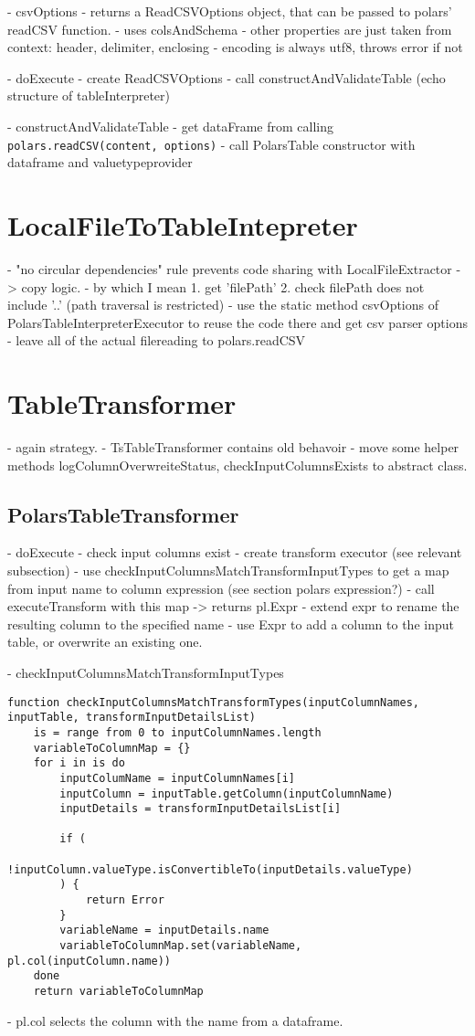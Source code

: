 - csvOptions
- returns a ReadCSVOptions object, that can be passed to polars' readCSV function.
- uses colsAndSchema
- other properties are just taken from context: header, delimiter, enclosing
- encoding is always utf8, throws error if not

- doExecute
- create ReadCSVOptions
- call constructAndValidateTable (echo structure of tableInterpreter)

- constructAndValidateTable
- get dataFrame from calling \Verb|polars.readCSV(content, options)|
- call PolarsTable constructor with dataframe and valuetypeprovider

\section{LocalFileToTableIntepreter}
- "no circular dependencies" rule prevents code sharing with LocalFileExtractor -> copy logic.
- by which I mean 1. get 'filePath' 2. check filePath does not include '..' (path traversal is restricted)
- use the static method csvOptions of PolarsTableInterpreterExecutor to reuse the code there and get csv parser options
- leave all of the actual filereading to polars.readCSV


\section{TableTransformer}
- again strategy.
- TsTableTransformer contains old behavoir
- move some helper methods logColumnOverwreiteStatus, checkInputColumnsExists to abstract class.

\subsection{PolarsTableTransformer}
- doExecute
- check input columns exist
- create transform executor (see relevant subsection)
- use checkInputColumnsMatchTransformInputTypes to get a map from input name to column expression (see section polars expression?)
- call executeTransform with this map -> returns pl.Expr
- extend expr to rename the resulting column to the specified name
- use Expr to add a column to the input table, or overwrite an existing one.


- checkInputColumnsMatchTransformInputTypes
\begin{listing}
	\begin{verbatim}
function checkInputColumnsMatchTransformTypes(inputColumnNames, inputTable, transformInputDetailsList)
	is = range from 0 to inputColumnNames.length
	variableToColumnMap = {}
	for i in is do
		inputColumName = inputColumnNames[i]
		inputColumn = inputTable.getColumn(inputColumnName)
		inputDetails = transformInputDetailsList[i]

		if (
			!inputColumn.valueType.isConvertibleTo(inputDetails.valueType)
		) {
			return Error
		}
		variableName = inputDetails.name
		variableToColumnMap.set(variableName, pl.col(inputColumn.name))
	done
	return variableToColumnMap
	\end{verbatim}
\end{listing}
- pl.col selects the column with the name from a dataframe.


